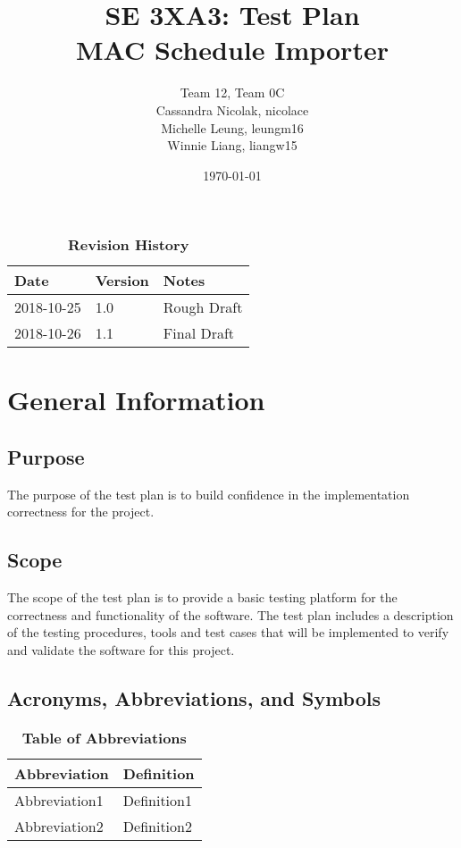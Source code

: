 \documentclass[12pt, titlepage]{article}
\title{SE 3XA3: Test Plan\\MAC Schedule Importer}
\author{Team 12, Team 0C
		\\ Cassandra Nicolak, nicolace
		\\ Michelle Leung, leungm16
		\\ Winnie Liang, liangw15
}
\date{\today}
\begin{document}
\maketitle

\tableofcontents
\listoftables
\listoffigures

\begin{table}[bp]
\caption{\bf Revision History}
\begin{tabularx}{\textwidth}{p{3cm}p{2cm}X}
\toprule {\bf Date} & {\bf Version} & {\bf Notes}\\
\midrule
2018-10-25 & 1.0 & Rough Draft\\
2018-10-26 & 1.1 & Final Draft\\
\bottomrule
\end{tabularx}
\end{table}

\newpage



\section{General Information}

\subsection{Purpose}
The purpose of the test plan is to build confidence in the implementation correctness for the project. 

\subsection{Scope}
The scope of the test plan is to provide a basic testing platform for the correctness and functionality of the software. The test plan includes a description of the testing procedures, tools and test cases that will be implemented to verify and validate the software for this project.
\subsection{Acronyms, Abbreviations, and Symbols}
	
\begin{table}[hbp]
\caption{\textbf{Table of Abbreviations}} \label{Table}

\begin{tabularx}{\textwidth}{p{3cm}X}
\toprule
\textbf{Abbreviation} & \textbf{Definition} \\
\midrule
Abbreviation1 & Definition1\\
Abbreviation2 & Definition2\\
\bottomrule
\end{tabularx}

\end{table}
\end{document}
